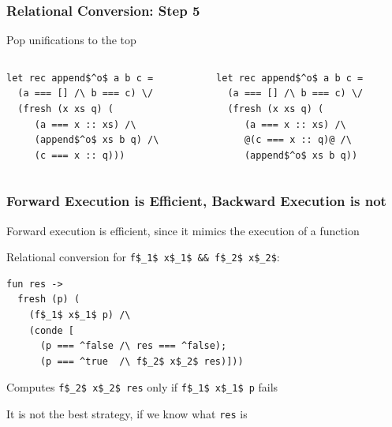 \documentclass[xcolor=table]{beamer}
\begin{document}
\begin{frame}[fragile]
  \transwipe[direction=90]
  \frametitle{Relational Conversion: Step 5}
  
Pop unifications to the top

\begin{columns}
\begin{column}{0.5\textwidth}
\begin{lstlisting}
let rec append$^o$ a b c =
  (a === [] /\ b === c) \/
  (fresh (x xs q) (
     (a === x :: xs) /\
     (append$^o$ xs b q) /\
     (c === x :: q)))
\end{lstlisting}
\end{column}
\begin{column}{0.5\textwidth}  
\begin{lstlisting}
let rec append$^o$ a b c =
  (a === [] /\ b === c) \/
  (fresh (x xs q) (
     (a === x :: xs) /\
     @(c === x :: q)@ /\
     (append$^o$ xs b q))
\end{lstlisting}
\end{column}
\end{columns}
\end{frame}


\begin{frame}[fragile]
  \transwipe[direction=90]
  \frametitle{Forward Execution is Efficient, Backward Execution is not}
  
  Forward execution is efficient, since it mimics the execution of a function
  
\vspace{6pt}  
  
Relational conversion for \lstinline{f$_1$ x$_1$ && f$_2$ x$_2$}: 
 
\begin{lstlisting}
fun res ->
  fresh (p) (
    (f$_1$ x$_1$ p) /\
    (conde [
      (p === ^false /\ res === ^false);
      (p === ^true  /\ f$_2$ x$_2$ res)]))
\end{lstlisting} 

Computes \lstinline{f$_2$ x$_2$ res} only if \lstinline{f$_1$ x$_1$ p} fails

\vspace{6pt}

It is not the best strategy, if we know what \lstinline{res} is

\end{frame}
\end{document}
